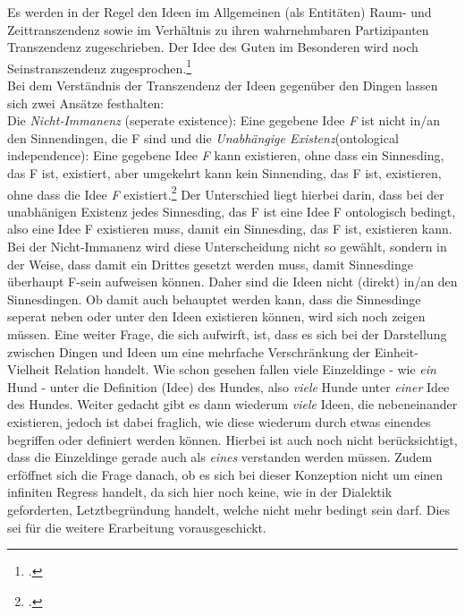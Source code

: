 Es werden in der Regel den Ideen im Allgemeinen (als Entitäten) Raum- und Zeittranszendenz sowie im Verhältnis zu ihren wahrnehmbaren Partizipanten Transzendenz zugeschrieben. Der Idee des Guten im Besonderen wird noch Seinstranszendenz zugesprochen.\footcite[vgl.][S. 347]{StrobelTranszendenz}\\
Bei dem Verständnis der Transzendenz der Ideen gegenüber den Dingen lassen sich zwei Ansätze festhalten:\\
Die \emph{Nicht-Immanenz} (seperate existence): Eine gegebene Idee \emph{F} ist nicht in/an den Sinnendingen, die F sind und die \emph{Unabhängige Existenz}(ontological independence): Eine gegebene Idee \emph{F} kann existieren, ohne dass ein Sinnesding, das F ist, existiert, aber umgekehrt kann kein Sinnending, das F ist, existieren, ohne dass die Idee \emph{F} existiert.\footcite[][S.348]{StrobelTranszendenz}
Der Unterschied liegt hierbei darin, dass bei der unabhänigen Existenz jedes Sinnesding, das F ist eine Idee F ontologisch bedingt, also eine Idee F existieren muss, damit ein Sinnesding, das F ist, existieren kann. Bei der Nicht-Immanenz wird diese Unterscheidung nicht so gewählt, sondern in der Weise, dass damit ein Drittes gesetzt werden muss, damit Sinnesdinge überhaupt F-sein aufweisen können. Daher sind die Ideen nicht (direkt) in/an den Sinnesdingen. Ob damit auch behauptet werden kann, dass die Sinnesdinge seperat neben oder unter den Ideen existieren können, wird sich noch zeigen müssen.
Eine weiter Frage, die sich aufwirft, ist, dass es sich bei der Darstellung zwischen Dingen und Ideen um eine mehrfache Verschränkung der Einheit-Vielheit Relation handelt. Wie schon gesehen fallen viele Einzeldinge - wie \emph{ein} Hund - unter die Definition (Idee) des Hundes, also \emph{viele} Hunde unter \emph{einer} Idee des Hundes. Weiter gedacht gibt es dann wiederum \emph{viele} Ideen, die nebeneinander existieren, jedoch ist dabei fraglich, wie diese wiederum durch etwas einendes begriffen oder definiert werden können. Hierbei ist auch noch nicht berücksichtigt, dass die Einzeldinge gerade auch als \emph{eines} verstanden werden müssen. Zudem erföffnet sich die Frage danach, ob es sich bei dieser Konzeption nicht um einen infiniten Regress handelt, da sich hier noch keine, wie in der Dialektik geforderten, Letztbegründung handelt, welche nicht mehr bedingt sein darf. Dies sei für die weitere Erarbeitung vorausgeschickt.
